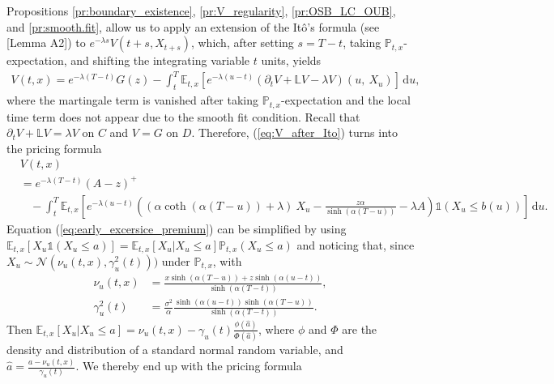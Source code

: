 \documentclass{tufte-handout}
\newcommand{\E}{\mathbb{E}} %
\renewcommand{\Pr}{\mathbb{P}} %
\begin{document}
	Propositions \ref{pr:boundary_existence}, \ref{pr:V_regularity}, \ref{pr:OSB_LC_OUB}, and \ref{pr:smooth.fit}, allow us to apply an extension of the Itô's formula (see \citet{d2020discounted}[Lemma A2]) to $e^{-\lambda s}V(t + s, X_{t + s})$, which, after setting $s = T - t$, taking $\Pr_{t, x}$-expectation, and shifting the integrating variable $t$ units, yields
	\begin{align}\label{eq:V_after_Ito}
		V(t, x) = e^{-\lambda (T - t)}G(z) - \int_{t}^{T}\E_{t, x}\left[e^{-\lambda (u - t)}(\partial_t V + \mathbb{L} V - \lambda V)(u,\ X_u)\right]\,\mathrm{d}u,
	\end{align} 
	where the martingale term is vanished after taking $\Pr_{t, x}$-expectation and the local time term does not appear due to the smooth fit condition. Recall that $\partial_t V + \mathbb{L} V = \lambda V$ on $C$ and $V = G$ on $D$. Therefore, (\ref{eq:V_after_Ito}) turns into the pricing formula
	\begin{equation}\label{eq:early_excersice_premium}
	\begin{aligned}
	&V\left(t, x\right) \\
	&= e^{-\lambda (T - t)}(A - z)^+ \\
	&\ \ \ \ - \int_{t}^{T}\E_{t, x}\left[e^{-\lambda (u - t)}\left(\left(\alpha\coth(\alpha(T - u)) + \lambda\right)\ X_{u} - \frac{z\alpha}{\sinh(\alpha(T - u))} - \lambda A \right)\mathbb{1}\left(X_{u}\leq b(u)\right)\right]\,\mathrm{d}u.
	\end{aligned}
	\end{equation}
	Equation (\ref{eq:early_excersice_premium}) can be simplified by using $\E_{t, x}[X_u\mathbb{1}(X_u\leq a)] = \E_{t, x}[X_u|X_u\leq a]\Pr_{t, x}(X_u \leq a)$ and noticing that, since $X_u\sim\mathcal{N}(\nu_u(t, x), \gamma_u^2(t)))$ under $\Pr_{t, x}$, with
	\begin{align}
		\nu_u(t, x) &= \frac{x\sinh(\alpha (T - u)) + z\sinh(\alpha (u - t))}{\sinh(\alpha (T - t))}, \label{eq:mean_Xu}\\
		\gamma_u^2(t) &= \frac{\sigma^2}{\alpha}\frac{\sinh(\alpha (u - t))\sinh(\alpha (T - u))}{\sinh(\alpha (T - t))} \label{eq:var_Xu}.
	\end{align}
	Then $\E_{t, x}[X_u | X_u \leq a] = \nu_u(t, x) - \gamma_u(t)\frac{\phi(\hat{a})}{\Phi(\hat{a})}$, where $\phi$ and $\Phi$ are the density and distribution of a standard normal random variable, and $\hat{a} = \frac{a - \nu_u(t, x)}{\gamma_u(t)}$. We thereby end up with the pricing formula
\end{document}

